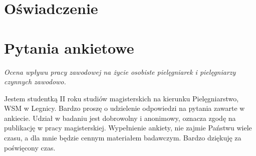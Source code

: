 \documentclass[a4paper,12pt,twoside,openright]{mwrep}
\begin{document}
\listoftables
\listoffigures





\begin{appendices}
\renewcommand\thechapter{\arabic{chapter}}
\renewcommand\thesection{\arabic{section}}

\renewcommand{\appendixpagename}{Aneks}
\renewcommand{\appendixname}{Załącznik}

\appendixpage

\chapter[Załącznik]{Oświadczenie}


\chapter[Załacznik]{Pytania ankietowe}
\label{app:ankieta}

\end{appendices}

\textit{\Large{Ocena wpływu pracy zawodowej na życie osobiste pielęgniarek i pielęgniarzy czynnych zawodowo.}}

\vspace{\baselineskip} 

Jestem studentką II roku studiów magisterskich na kierunku Pielęgniarstwo, WSM w Legnicy. Bardzo proszę o udzielenie odpowiedzi na pytania zawarte w ankiecie. Udział w badaniu jest dobrowolny i anonimowy, oznacza zgodę na publikację w pracy magisterskiej. Wypełnienie ankiety, nie zajmie Państwu wiele czasu, a dla mnie będzie cennym materiałem badawczym. Bardzo dziękuję za poświęcony czas.
\end{document}
